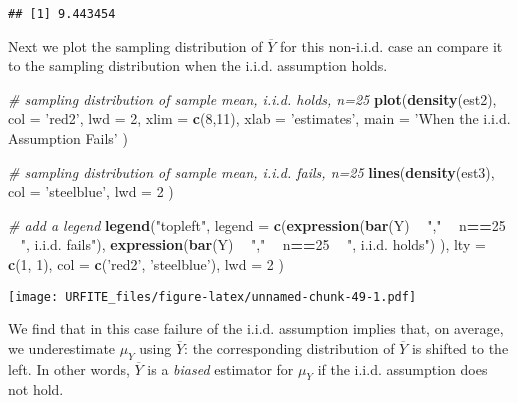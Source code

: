 \documentclass[]{book}
\newenvironment{Shaded}{\begin{snugshade}}{\end{snugshade}}
\newcommand{\KeywordTok}[1]{\textcolor[rgb]{0.13,0.29,0.53}{\textbf{#1}}}
\newcommand{\DataTypeTok}[1]{\textcolor[rgb]{0.13,0.29,0.53}{#1}}
\newcommand{\DecValTok}[1]{\textcolor[rgb]{0.00,0.00,0.81}{#1}}
\newcommand{\StringTok}[1]{\textcolor[rgb]{0.31,0.60,0.02}{#1}}
\newcommand{\CommentTok}[1]{\textcolor[rgb]{0.56,0.35,0.01}{\textit{#1}}}
\newcommand{\OperatorTok}[1]{\textcolor[rgb]{0.81,0.36,0.00}{\textbf{#1}}}
\newcommand{\NormalTok}[1]{#1}
\theoremstyle{definition}
\theoremstyle{definition}
\theoremstyle{definition}
\theoremstyle{remark}
\begin{document}
\begin{verbatim}
## [1] 9.443454
\end{verbatim}

Next we plot the sampling distribution of \(\overline{Y}\) for this
non-i.i.d. case an compare it to the sampling distribution when the
i.i.d. assumption holds.

\begin{Shaded}
\begin{Highlighting}[]
\CommentTok{# sampling distribution of sample mean, i.i.d. holds, n=25}
\KeywordTok{plot}\NormalTok{(}\KeywordTok{density}\NormalTok{(est2), }
      \DataTypeTok{col =} \StringTok{'red2'}\NormalTok{,}
      \DataTypeTok{lwd =} \DecValTok{2}\NormalTok{,}
      \DataTypeTok{xlim =} \KeywordTok{c}\NormalTok{(}\DecValTok{8}\NormalTok{,}\DecValTok{11}\NormalTok{),}
      \DataTypeTok{xlab =} \StringTok{'estimates'}\NormalTok{,}
      \DataTypeTok{main =} \StringTok{'When the i.i.d. Assumption Fails'}
\NormalTok{     )}

\CommentTok{# sampling distribution of sample mean, i.i.d. fails, n=25}
\KeywordTok{lines}\NormalTok{(}\KeywordTok{density}\NormalTok{(est3),}
      \DataTypeTok{col =} \StringTok{'steelblue'}\NormalTok{,}
      \DataTypeTok{lwd =} \DecValTok{2}
\NormalTok{      )}

\CommentTok{# add a legend}
\KeywordTok{legend}\NormalTok{(}\StringTok{"topleft"}\NormalTok{,}
       \DataTypeTok{legend =} \KeywordTok{c}\NormalTok{(}\KeywordTok{expression}\NormalTok{(}\KeywordTok{bar}\NormalTok{(Y) }\OperatorTok{~}\StringTok{ ","} \OperatorTok{~}\StringTok{ }\NormalTok{n}\OperatorTok{==}\DecValTok{25} \OperatorTok{~}\StringTok{ ", i.i.d. fails"}\NormalTok{),}
                  \KeywordTok{expression}\NormalTok{(}\KeywordTok{bar}\NormalTok{(Y) }\OperatorTok{~}\StringTok{ ","} \OperatorTok{~}\StringTok{ }\NormalTok{n}\OperatorTok{==}\DecValTok{25} \OperatorTok{~}\StringTok{ ", i.i.d. holds"}\NormalTok{)}
\NormalTok{                  ), }
       \DataTypeTok{lty =} \KeywordTok{c}\NormalTok{(}\DecValTok{1}\NormalTok{, }\DecValTok{1}\NormalTok{), }
       \DataTypeTok{col =} \KeywordTok{c}\NormalTok{(}\StringTok{'red2'}\NormalTok{, }\StringTok{'steelblue'}\NormalTok{),}
       \DataTypeTok{lwd =} \DecValTok{2}
\NormalTok{       )}
\end{Highlighting}
\end{Shaded}

\texttt{[image: URFITE\_files/figure-latex/unnamed-chunk-49-1.pdf]}

We find that in this case failure of the i.i.d. assumption implies that,
on average, we underestimate \(\mu_Y\) using \(\overline{Y}\): the
corresponding distribution of \(\overline{Y}\) is shifted to the left.
In other words, \(\overline{Y}\) is a \emph{biased} estimator for
\(\mu_Y\) if the i.i.d. assumption does not hold.
\end{document}
